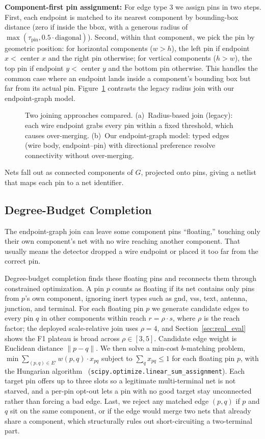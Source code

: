 \documentclass[journal]{IEEEtran}
\begin{document}
\textbf{Component-first pin assignment:} For edge type 3 we assign pins in two steps. First, each endpoint is matched to its nearest component by bounding-box distance (zero if inside the bbox, with a generous radius of $\max(\tau_{\text{pin}}, 0.5 \cdot \text{diagonal})$). Second, within that component, we pick the pin by geometric position: for horizontal components ($w > h$), the left pin if endpoint $x <$ center $x$ and the right pin otherwise; for vertical components ($h > w$), the top pin if endpoint $y <$ center $y$ and the bottom pin otherwise. This handles the common case where an endpoint lands inside a component's bounding box but far from its actual pin. Figure~\ref{fig:endpoint_graph} contrasts the legacy radius join with our endpoint-graph model.

\begin{figure}[t]
\centering

\caption{Two joining approaches compared. (a)~Radius-based join (legacy): each wire endpoint grabs every pin within a fixed threshold, which causes over-merging. (b)~Our endpoint-graph model: typed edges (wire body, endpoint--pin) with directional preference resolve connectivity without over-merging.}
\label{fig:endpoint_graph}
\end{figure}

Nets fall out as connected components of $G$, projected onto pins, giving a netlist that maps each pin to a net identifier.

\subsection{Degree-Budget Completion}

The endpoint-graph join can leave some component pins ``floating,'' touching only their own component's net with no wire reaching another component. That usually means the detector dropped a wire endpoint or placed it too far from the correct pin.

Degree-budget completion finds these floating pins and reconnects them through constrained optimization. A pin $p$ counts as floating if its net contains only pins from $p$'s own component, ignoring inert types such as gnd, vss, text, antenna, junction, and terminal. For each floating pin $p$ we generate candidate edges to every pin $q$ in other components within reach $r = \rho \cdot s$, where $\rho$ is the reach factor; the deployed scale-relative join uses $\rho = 4$, and Section~\ref{sec:real_eval} shows the F1 plateau is broad across $\rho \in [3,5]$. Candidate edge weight is Euclidean distance $\|p - q\|$. We then solve a min-cost $b$-matching problem, $\min \sum_{(p,q) \in E'} w(p,q) \cdot x_{pq}$ subject to $\sum_q x_{pq} \leq 1$ for each floating pin $p$, with the Hungarian algorithm~\cite{kuhn1955} (\texttt{scipy.optimize.linear\_sum\_assignment}). Each target pin offers up to three slots so a legitimate multi-terminal net is not starved, and a per-pin opt-out lets a pin with no good target stay unconnected rather than forcing a bad edge. Last, we reject any matched edge $(p, q)$ if $p$ and $q$ sit on the same component, or if the edge would merge two nets that already share a component, which structurally rules out short-circuiting a two-terminal part.
\end{document}
